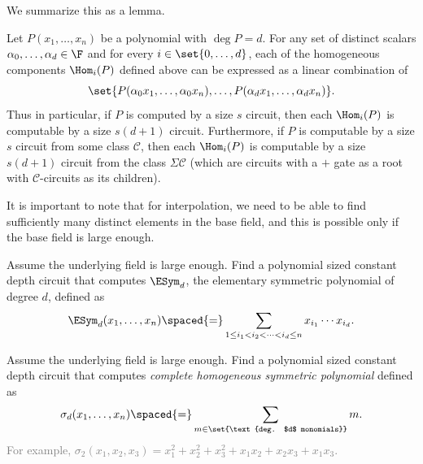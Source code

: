 We summarize this as a lemma. 

\begin{lemma}\label{lem:computing-hom-components}
Let $P(x_1,\ldots, x_n)$ be a polynomial with $\deg P = d$. For any set of distinct scalars $\alpha_0, \ldots, \alpha_{d} \in \F$ and for every $i \in \set{0,\ldots, d}$,  each of the homogeneous components $\Hom_i(P)$ defined above can be expressed as a linear combination of 
\[
\set{P(\alpha_0x_1,\ldots, \alpha_0x_n), \ldots, P(\alpha_dx_1,\ldots, \alpha_dx_n)}.
\]
Thus in particular, if $P$ is computed by a size $s$ circuit, then each $\Hom_i(P)$ is computable  by a size $s(d+1)$ circuit. Furthermore, if $P$ is computable by a size $s$ circuit from some class $\mathcal{C}$, then each $\Hom_i(P)$ is computable by a size $s(d+1)$ circuit from the class $\Sigma \mathcal{C}$ (which are circuits with a $+$ gate as a root with $\mathcal{C}$-circuits as its children).
\end{lemma}

It is important to note that for interpolation, we need to be able to find sufficiently many distinct elements in the base field, and this is possible only if the base field is large enough. 

\begin{exercise}\label{ex:ben-or-trick}
Assume the underlying field is large enough. Find a polynomial sized constant depth circuit that computes $\ESym_d$, the elementary symmetric polynomial of degree $d$, defined as
\[
\ESym_{d}(x_1,\ldots, x_n) \spaced{=} \sum_{1\leq i_1 < i_2 < \cdots < i_d \leq n} x_{i_1} \cdots x_{i_d}.
\]
\end{exercise}

\begin{exercise}
Assume the underlying field is large enough. Find a polynomial sized constant depth circuit that computes \emph{complete homogeneous symmetric polynomial} defined as
\[
\sigma_d(x_1,\ldots, x_n) \spaced{=} \sum_{m \in \set{\text{deg. $d$ monomials}}} m.
\]
\textcolor{gray}{For example, $\sigma_2(x_1,x_2,x_3) = x_1^2 + x_2^2 + x_3^2 + x_1x_2 + x_2x_3 + x_1x_3$.}
\end{exercise}

